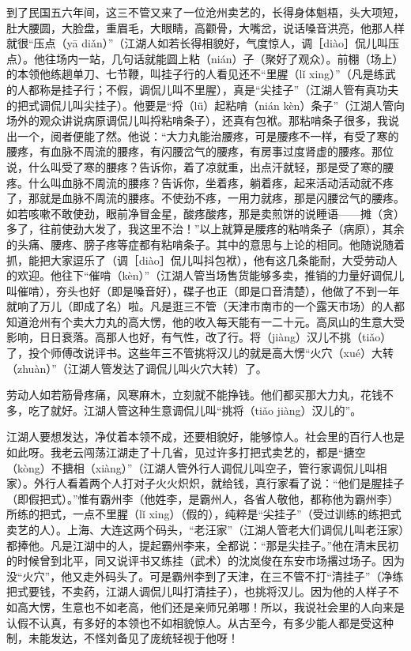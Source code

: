 \documentclass[12pt,UTF8]{ctexbook}
\begin{document}
到了民国五六年间，这三不管又来了一位沧州卖艺的，长得身体魁梧，头大项短，肚大腰圆，大脸盘，重眉毛，大眼睛，高颧骨，大嘴岔，说话嗓音洪亮，他那人样就很“压点（yā diǎn）”（江湖人如若长得相貌好，气度惊人，调［diào］侃儿叫压点）。他往场内一站，几句话就能圆上粘（nián）子（聚好了观众）。前棚（场上）的本领他练趟单刀、七节鞭，叫挂子行的人看见还不“里腥（lǐ xing）”（凡是练武的人都称是挂子行；不假，调侃儿叫不里腥），真是“尖挂子”（江湖人管有真功夫的把式调侃儿叫尖挂子）。他要是“捋（lǖ）起粘啃（nián kèn）条子”（江湖人管向场外的观众讲说病原调侃儿叫捋粘啃条子），还真有包袱。那粘啃条子很多，我说出一个，阅者便能了然。他说：“大力丸能治腰疼，可是腰疼不一样，有受了寒的腰疼，有血脉不周流的腰疼，有闪腰岔气的腰疼，有房事过度肾虚的腰疼。那位说，什么叫受了寒的腰疼？告诉你，着了凉就重，出点汗就轻，那是受了寒的腰疼。什么叫血脉不周流的腰疼？告诉你，坐着疼，躺着疼，起来活动活动就不疼了，那就是血脉不周流的腰疼。不使劲不疼，一用力就疼，那是闪腰岔气的腰疼。如若咳嗽不敢使劲，眼前净冒金星，酸疼酸疼，那是卖煎饼的说睡语——摊（贪）多了，往前使劲大发了，我这里不治！”以上就算是腰疼的粘啃条子（病原），其余的头痛、腰疼、膀子疼等症都有粘啃条子。其中的意思与上论的相同。他随说随着抓，能把大家逗乐了（调［diào］侃儿叫抖包袱），他有这几条能耐，大受劳动人的欢迎。他往下“催啃（kèn）”（江湖人管当场售货能够多卖，推销的力量好调侃儿叫催啃），夯头也好（即是嗓音好），碟子也正（即是口音清楚），他做了不到一年就响了万儿（即成了名）啦。凡是逛三不管（天津市南市的一个露天市场）的人都知道沧州有个卖大力丸的高大愣，他的收入每天能有一二十元。高凤山的生意大受影响，日日衰落。高那人也好，有气性，改了行。将（jiàng）汉儿不挑（tiǎo）了，投个师傅改说评书。这些年三不管挑将汉儿的就是高大愣“火穴（xué）大转（zhuàn）”（江湖人管发达了调侃儿叫火穴大转）了。

劳动人如若筋骨疼痛，风寒麻木，立刻就不能挣钱。他们都买那大力丸，花钱不多，吃了就好。江湖人管这种生意调侃儿叫“挑将（tiǎo jiàng）汉儿的”。



江湖人要想发达，净仗着本领不成，还要相貌好，能够惊人。社会里的百行人也是如此呀。我老云闯荡江湖走了十几省，见过许多打把式卖艺的，都是“搪空（kòng）不搪相（xiàng）”（江湖人管外行人调侃儿叫空子，管行家调侃儿叫相家）。外行人看着两个人打对子火火炽炽，就给钱，真行家看了说：“他们是腥挂子（即假把式）。”惟有霸州李（他姓李，是霸州人，各省人敬他，都称他为霸州李）所练的把式，一点不里腥（lǐ xing）（假的），纯粹是“尖挂子”（受过训练的练把式卖艺的人）。上海、大连这两个码头，“老汪家”（江湖人管老大们调侃儿叫老汪家）都捧他。凡是江湖中的人，提起霸州李来，全都说：“那是尖挂子。”他在清末民初的时候曾到北平，同又说评书又练挂（武术）的沈岚俊在东安市场撂过场子。因为没“火穴”，他又走外码头了。可是霸州李到了天津，在三不管不打“清挂子”（净练把式要钱，不卖药，江湖人调侃儿叫打清挂子），也挑将汉儿。因为他的人样子不如高大愣，生意也不如老高，他们还是亲师兄弟哪！所以，我说社会里的人向来是认假不认真，有多好的本领也不如相貌惊人。从古至今，有多少能人都是受这种制，未能发达，不怪刘备见了庞统轻视于他呀！
\end{document}
